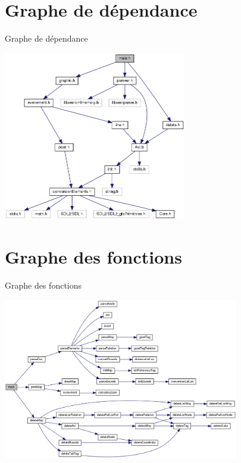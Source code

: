 \documentclass[french]{beamer}
\begin{document}
\section{Graphe de dépendance}
\begin{frame}{Graphe de dépendance}
	\begin{center}
		\includegraphics[width=8cm]{dependances.png}
	\end{center}
\end{frame}

\section{Graphe des fonctions}
\begin{frame}{Graphe des fonctions}
	\begin{center}
		\includegraphics[width=10.3cm]{fonctions.png}
	\end{center}
\end{frame}
\end{document}
